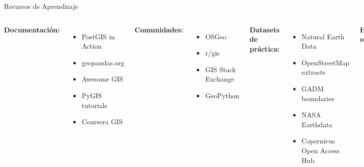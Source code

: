 \documentclass[10pt,aspectratio=169]{beamer}
\begin{document}
\begin{frame}{Recursos de Aprendizaje}
    \begin{columns}[T]
        \textbf{Documentación:}
        \begin{itemize}
            \item \faBook\space PostGIS in Action
            \item \faGlobe\space geopandas.org
            \item \faGithub\space Awesome GIS
            \item \faYoutube\space PyGIS tutorials
            \item \faGraduationCap\space Coursera GIS
        \end{itemize}
        
        \vspace{0.3cm}
        \textbf{Comunidades:}
        \begin{itemize}
            \item \faUsers\space OSGeo
            \item \faReddit\space r/gis
            \item \faStackOverflow\space GIS Stack Exchange
            \item \faSlack\space GeoPython
        \end{itemize}
        
        \textbf{Datasets de práctica:}
        \begin{itemize}
            \item Natural Earth Data
            \item OpenStreetMap extracts
            \item GADM boundaries
            \item NASA Earthdata
            \item Copernicus Open Access Hub
        \end{itemize}
        
        \vspace{0.3cm}
        \textbf{Herramientas online:}
        \begin{itemize}
            \item geojson.io
            \item kepler.gl
            \item Overpass Turbo
            \item QGIS Cloud
        \end{itemize}
    \end{columns}
\end{frame}
\end{document}
